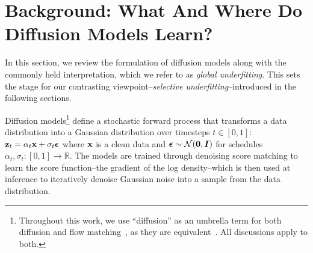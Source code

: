 \section{Background: What And Where Do Diffusion Models Learn?} \label{sec:background}
In this section, we review the formulation of diffusion models along with the commonly held interpretation, which we refer to as \emph{global underfitting}. This sets the stage for our contrasting viewpoint--\emph{selective underfitting}--introduced in the following sections.

Diffusion models\footnote{Throughout this work, we use ``diffusion'' as an umbrella term for both diffusion and flow matching~\citep{lipman2022flow,liu2022flow}, as they are equivalent~\citep{gao2025diffusion}. All discussions apply to both.} define a stochastic forward process that transforms a data distribution into a Gaussian distribution over timesteps $t \in [0, 1]$: ${\mathbf{z}}_t = \alpha_t {\mathbf{x}} + \sigma_t {\boldsymbol{\epsilon}}$ where ${\mathbf{x}}$ is a clean data and ${\boldsymbol{\epsilon}} \sim {\mathcal{N}}({\bm{0}}, {\bm{I}})$ for schedules $\alpha_t,\sigma_t \colon [0,1] \to \mathbb{R}$. The models are trained through denoising score matching  to learn the score function--the gradient of the log density--which is then used at inference to iteratively denoise Gaussian noise into a sample from the data distribution.




